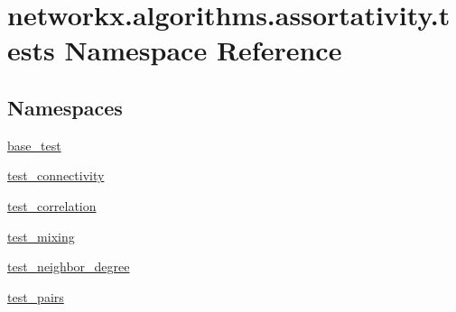 \hypertarget{namespacenetworkx_1_1algorithms_1_1assortativity_1_1tests}{}\section{networkx.\+algorithms.\+assortativity.\+tests Namespace Reference}
\label{namespacenetworkx_1_1algorithms_1_1assortativity_1_1tests}
\subsection*{Namespaces}
\begin{DoxyCompactItemize}
\item 
 \hyperlink{namespacenetworkx_1_1algorithms_1_1assortativity_1_1tests_1_1base__test}{base\+\_\+test}
\item 
 \hyperlink{namespacenetworkx_1_1algorithms_1_1assortativity_1_1tests_1_1test__connectivity}{test\+\_\+connectivity}
\item 
 \hyperlink{namespacenetworkx_1_1algorithms_1_1assortativity_1_1tests_1_1test__correlation}{test\+\_\+correlation}
\item 
 \hyperlink{namespacenetworkx_1_1algorithms_1_1assortativity_1_1tests_1_1test__mixing}{test\+\_\+mixing}
\item 
 \hyperlink{namespacenetworkx_1_1algorithms_1_1assortativity_1_1tests_1_1test__neighbor__degree}{test\+\_\+neighbor\+\_\+degree}
\item 
 \hyperlink{namespacenetworkx_1_1algorithms_1_1assortativity_1_1tests_1_1test__pairs}{test\+\_\+pairs}
\end{DoxyCompactItemize}
